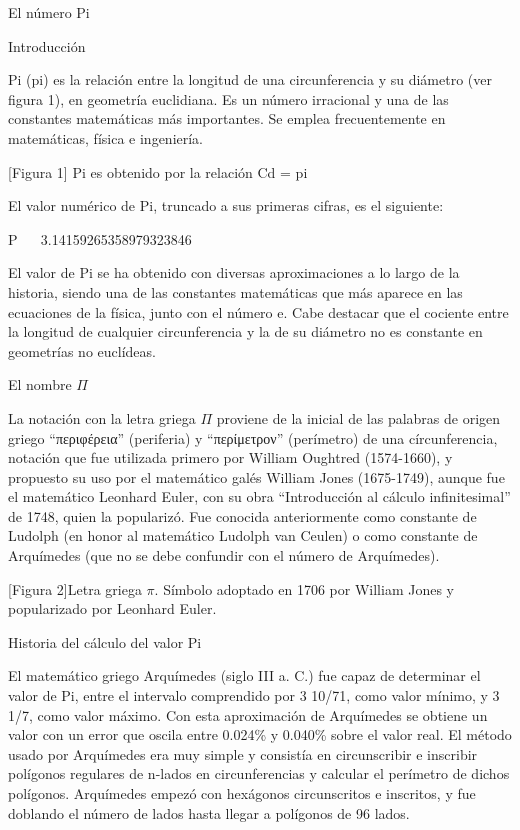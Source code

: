 \documentclass[12pt,letterpaper]{article}
\author{Tu nombre}
\title{}
\begin{document}
\maketitle
El número Pi

Introducción

Pi (pi) es la relación entre la longitud de una circunferencia y su diámetro (ver figura 1), en geometría euclidiana. Es un número irracional y una de las constantes matemáticas más importantes. Se emplea frecuentemente en matemáticas, física e ingeniería. 

[Figura 1]
{Pi es obtenido por la relación Cd  = pi}

El valor numérico de Pi, truncado a sus primeras cifras, es el siguiente:

P ~~ 3.14159265358979323846

El valor de Pi se ha obtenido con diversas aproximaciones a lo largo de la historia, siendo una de las constantes matemáticas que más aparece en las ecuaciones de la física, junto con el número e. Cabe destacar que el cociente entre la longitud de cualquier circunferencia y la de su diámetro no es constante en geometrías no euclídeas.


El nombre $\Pi$

La notación con la letra griega $\Pi$ proviene de la inicial de las palabras de origen griego ``\textgreek{περιφέρεια}'' (periferia) y ``\textgreek{περίμετρον}'' (perímetro) de una círcunferencia, notación que fue utilizada primero por William Oughtred (1574-1660), y propuesto su uso por el matemático galés William Jones (1675-1749), aunque fue el matemático Leonhard Euler, con su obra ``Introducción al cálculo infinitesimal'' de 1748, quien la popularizó. Fue conocida anteriormente como constante de Ludolph (en honor al matemático Ludolph van Ceulen) o como constante de Arquímedes (que no se debe confundir con el número de Arquímedes).

[Figura 2]{Letra griega $\pi$. Símbolo adoptado en 1706 por William Jones y popularizado por Leonhard Euler.}


Historia del cálculo del valor Pi

El matemático griego Arquímedes (siglo III a. C.) fue capaz de determinar el valor de Pi, entre el intervalo comprendido por 3 10/71, como valor mínimo, y 3 1/7, como valor máximo. Con esta aproximación de Arquímedes se obtiene un valor con un error que oscila entre 0.024\% y 0.040\% sobre el valor real. El método usado por Arquímedes era muy simple y consistía en circunscribir e inscribir polígonos regulares de n-lados en circunferencias y calcular el perímetro de dichos polígonos. Arquímedes empezó con hexágonos circunscritos e inscritos, y fue doblando el número de lados hasta llegar a polígonos de 96 lados.
\end{document}
